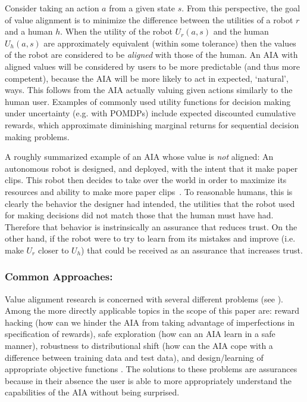 Consider taking an action $a$ from a given state $s$. From this perspective, the goal of value alignment is to minimize the difference between the utilities of a robot $r$ and a human $h$. When the utility of the robot $U_r(a,s)$ and the human $U_h(a,s)$ are approximately equivalent (within some tolerance) then the values of the robot are considered to be \emph{aligned} with those of the human. An AIA with aligned values will be considered by users to be more predictable (and thus more competent), because the AIA will be more likely to act in expected, `natural', ways. This follows from the AIA actually valuing given actions similarly to the human user.
Examples of commonly used utility functions for decision making under uncertainty (e.g. with POMDPs) include expected discounted cumulative rewards, which approximate diminishing marginal returns for sequential decision making problems. 

A roughly summarized example of an AIA whose value is \emph{not} aligned: An autonomous robot is designed, and deployed, with the intent that it make paper clips. This robot then decides to take over the world in order to maximize its resources and ability to make more paper clips~\cite{Bostrom2014-fz}. To reasonable humans, this is clearly  the behavior the designer had intended, the utilities that the robot used for making decisions did not match those that the human must have had. Therefore that behavior is instrinsically an assurance that reduces trust. On the other hand, if the robot were to try to learn from its mistakes and improve (i.e. make $U_r$ closer to $U_h$) that could be received as an assurance that increases trust.

\subsubsection{Common Approaches:}
Value alignment research is concerned with several different problems (see \cite{Gordon_Worley2018-xy,Amodei2016-xi}). Among the more directly applicable topics in the scope of this paper are: reward hacking (how can we hinder the AIA from taking advantage of imperfections in specification of rewards), safe exploration (how can an AIA learn in a safe manner), robustness to distributional shift (how can the AIA cope with a difference between training data and test data), and design/learning of appropriate objective functions \cite{Hadfield-Menell2016-ws,Da_Veiga2012-gh,Garcia2015-rs}. The solutions to these problems are assurances because in their absence the user is able to more appropriately understand the capabilities of the AIA without being surprised.

